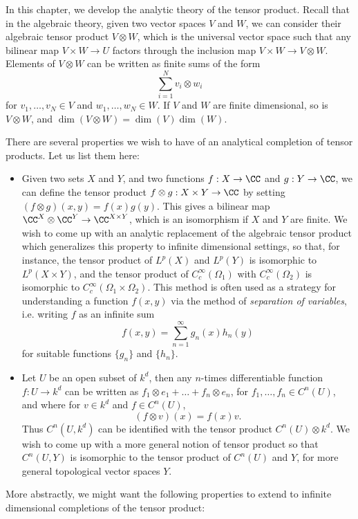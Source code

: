 In this chapter, we develop the analytic theory of the tensor product. Recall that in the algebraic theory, given two vector spaces $V$ and $W$, we can consider their algebraic tensor product $V \otimes W$, which is the universal vector space such that any bilinear map $V \times W \to U$ factors through the inclusion map $V \times W \to V \otimes W$. Elements of $V \otimes W$ can be written as finite sums of the form
%
\[ \sum_{i=1}^N v_i \otimes w_i \]
%
for $v_1,\dots,v_N \in V$ and $w_1,\dots,w_N \in W$. If $V$ and $W$ are finite dimensional, so is $V \otimes W$, and $\dim(V \otimes W) = \dim(V) \dim(W)$.

There are several properties we wish to have of an analytical completion of tensor products. Let us list them here:
%
\begin{itemize}
    \item Given two sets $X$ and $Y$, and two functions $f: X \to \CC$ and $g: Y \to \CC$, we can define the tensor product $f \otimes g: X \times Y \to \CC$ by setting $(f \otimes g)(x,y) = f(x) g(y)$. This gives a bilinear map $\CC^X \otimes \CC^Y \to \CC^{X \times Y}$, which is an isomorphism if $X$ and $Y$ are finite. We wish to come up with an analytic replacement of the algebraic tensor product which generalizes this property to infinite dimensional settings, so that, for instance, the tensor product of $L^p(X)$ and $L^p(Y)$ is isomorphic to $L^p(X \times Y)$, and the tensor product of $C_c^\infty(\Omega_1)$ with $C_c^\infty(\Omega_2)$ is isomorphic to $C_c^\infty(\Omega_1 \times \Omega_2)$. This method is often used as a strategy for understanding a function $f(x,y)$ via the method of \emph{separation of variables}, i.e. writing $f$ as an infinite sum
    \[ f(x,y) = \sum_{n = 1}^\infty g_n(x) h_n(y) \]
    for suitable functions $\{ g_n \}$ and $\{ h_n \}$.

    \item Let $U$ be an open subset of $k^d$, then any $n$-times differentiable function $f: U \to k^d$ can be written as $f_1 \otimes e_1 + \dots + f_n \otimes e_n$, for $f_1,\dots,f_n \in C^n(U)$, and where for $v \in k^d$ and $f \in C^n(U)$,
    \[ (f \otimes v)(x) = f(x) v. \]
    Thus $C^n(U,k^d)$ can be identified with the tensor product $C^n(U) \otimes k^d$. We wish to come up with a more general notion of tensor product so that $C^n(U,Y)$ is isomorphic to the tensor product of $C^n(U)$ and $Y$, for more general topological vector spaces $Y$.
\end{itemize}
%
More abstractly, we might want the following properties to extend to infinite dimensional completions of the tensor product:
